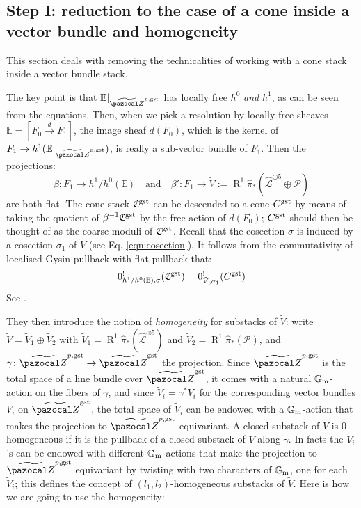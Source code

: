 \documentclass[11pt]{amsart}
\renewcommand{\to}{\rightarrow}
\newcommand{\tZ}{\widetilde{\pazocal Z}}
\newcommand{\R}{\operatorname{R}}
\newcommand{\Gm}{\mathbb{G}_{\rm{m}}}
\theoremstyle{plain}
\theoremstyle{definition}
\begin{document}
\subsection*{Step I: reduction to the case of a cone inside a vector bundle and homogeneity}
This section deals with removing the technicalities of working with a cone stack inside a vector bundle stack.

The key point is that $\mathbb E\rvert_{\tZ^{p,\rm{gst}}}$ has locally free $h^0$ \emph{and} $h^1$, as can be seen from the equations. Then, when we pick a resolution by locally free sheaves $\mathbb E=[F_0\xrightarrow{d} F_1]$, the image sheaf $d(F_0)$, which is the kernel of $F_1\to h^1(\mathbb E\rvert_{\tZ^{p,\rm{gst}}})$, is really a sub-vector bundle of $F_1$. Then the projections:
\[
 \beta\colon F_1\to h^1/h^0(\mathbb E) \quad \text{and} \quad \beta'\colon F_1\to \tilde{V}:=\R^1\hat{\pi}_*(\hat{\mathcal L}^{\oplus 5}\oplus\mathcal P)
\]
are both flat. The cone stack $\mathfrak C^{\rm{gst}}$ can be descended to a cone $C^{\rm{gst}}$ by means of taking the quotient of $\beta^{-1}\mathfrak C^{\rm{gst}}$ by the free action of $d(F_0)$; $C^{\rm{gst}}$ should then be thought of as the coarse moduli of $\mathfrak C^{\rm{gst}}$. Recall that the cosection $\sigma$ is induced by a cosection $\sigma_1$ of $\tilde V$ (see Eq. \eqref{eqn:cosection}). It follows from the commutativity of localised Gysin pullback with flat pullback that:
\[
 0^!_{h^1/h^0(\mathbb E),\sigma}(\mathfrak C^{\rm{gst}})= 0^!_{\tilde V,\sigma_1}(C^{\rm{gst}})
\]
See \cite[Proposition 6.3]{CLpfields}.

They then introduce the notion of \emph{homogeneity} for substacks of $\tilde V$: write $\tilde V=\tilde V_1\oplus\tilde V_2$ with $\tilde V_1=\R^1\hat{\pi}_*(\hat{\mathcal L}^{\oplus 5})$ and $\tilde V_2=\R^1\hat{\pi}_*(\mathcal P)$, and $\gamma\colon \tZ^{p,\rm{gst}}\to\tZ^{\rm{gst}}$ the projection. Since $\tZ^{p,\rm{gst}}$ is the total space of a line bundle over $\tZ^{\rm{gst}}$, it comes with a natural $\Gm$-action on the fibers of $\gamma$, and since $\tilde V_i=\gamma^*V_i$ for the corresponding vector bundles $V_i$ on $\tZ^{\rm{gst}}$, the total space of $\tilde V_i$ can be endowed with a $\Gm$-action that makes the projection to $\tZ^{p,\rm{gst}}$ equivariant. A closed substack of $\tilde V$ is $0$-homogeneous if it is the pullback of a closed substack of $V$ along $\gamma$. In facts the $\tilde V_i$'s can be endowed with different $\Gm$ actions that make the projection to $\tZ^{p,\rm{gst}}$ equivariant by twisting with two characters of $\Gm$, one for each $\tilde V_i$; this defines the concept of $(l_1,l_2)$-homogeneous substacks of $\tilde V$. Here is how we are going to use the homogeneity:
\end{document}
